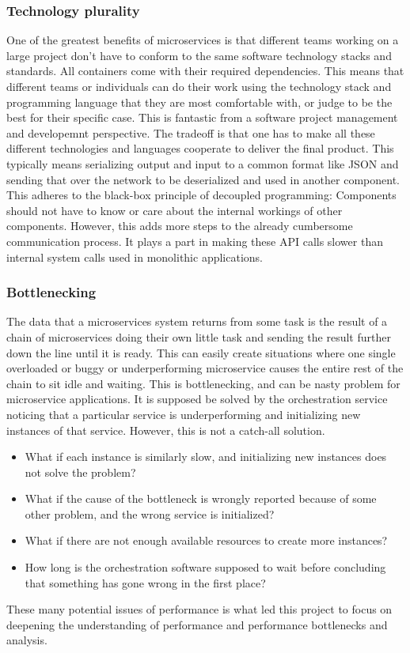 \subsubsection*{Technology plurality}
One of the greatest benefits of microservices is that different teams working on a large project don't have to conform to the same software technology stacks and standards. All containers come with their required dependencies.
This means that different teams or individuals can do their work using the technology stack and programming language that they are most comfortable with, or judge to be the best for their specific case.
This is fantastic from a software project management and developemnt perspective.
The tradeoff is that one has to make all these different technologies and languages cooperate to deliver the final product.
This typically means serializing output and input to a common format like JSON and sending that over the network to be deserialized and used in another component.
This adheres to the black-box principle of decoupled programming: Components should not have to know or care about the internal workings of other components.
However, this adds more steps to the already cumbersome communication process. It plays a part in making these API calls slower than internal system calls used in monolithic applications.

\subsubsection*{Bottlenecking}
The data that a microservices system returns from some task is the result of a chain of microservices doing their own little task and sending the result further down the line until it is ready.
This can easily create situations where one single overloaded or buggy or underperforming microservice causes the entire rest of the chain to sit idle and waiting.
This is bottlenecking, and can be nasty problem for microservice applications.
It is supposed be solved by the orchestration service noticing that a particular service is underperforming and initializing new instances of that service.
However, this is not a catch-all solution.

\begin{itemize}
    \item What if each instance is similarly slow, and initializing new instances does not solve the problem?
    \item What if the cause of the bottleneck is wrongly reported because of some other problem, and the wrong service is initialized?
    \item What if there are not enough available resources to create more instances?
    \item How long is the orchestration software supposed to wait before concluding that something has gone wrong in the first place?
\end{itemize}

These many potential issues of performance is what led this project to focus on deepening the understanding of performance and performance bottlenecks and analysis.